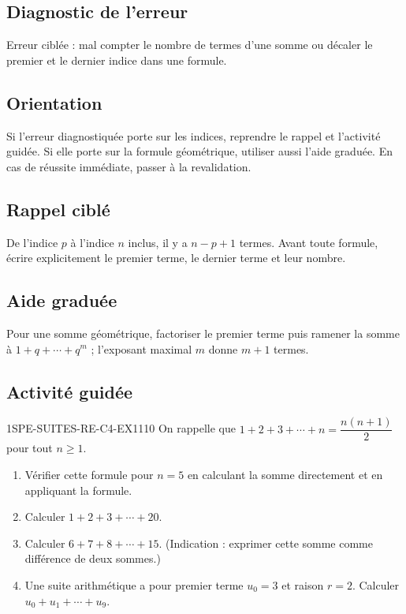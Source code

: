 

\subsection*{Diagnostic de l'erreur}
Erreur ciblée : mal compter le nombre de termes d'une somme ou décaler le
premier et le dernier indice dans une formule.

\subsection*{Orientation}
Si l'erreur diagnostiquée porte sur les indices, reprendre le rappel et
l'activité guidée. Si elle porte sur la formule géométrique, utiliser aussi
l'aide graduée. En cas de réussite immédiate, passer à la revalidation.

\subsection*{Rappel ciblé}
De l'indice $p$ à l'indice $n$ inclus, il y a $n-p+1$ termes. Avant toute
formule, écrire explicitement le premier terme, le dernier terme et leur
nombre.

\subsection*{Aide graduée}
Pour une somme géométrique, factoriser le premier terme puis ramener la somme
à $1+q+\cdots+q^m$ ; l'exposant maximal $m$ donne $m+1$ termes.

\subsection*{Activité guidée}


\begin{exercice}{1SPE-SUITES-RE-C4-EX1}{1}{10}
On rappelle que $1 + 2 + 3 + \cdots + n = \dfrac{n(n+1)}{2}$ pour tout $n \geq 1$.
\begin{enumerate}
  \item Vérifier cette formule pour $n = 5$ en calculant la somme directement et en appliquant la formule.
  \item Calculer $1 + 2 + 3 + \cdots + 20$.
  \item Calculer $6 + 7 + 8 + \cdots + 15$. (Indication : exprimer cette somme comme différence de deux sommes.)
  \item Une suite arithmétique a pour premier terme $u_0 = 3$ et raison $r = 2$. Calculer $u_0 + u_1 + \cdots + u_9$.
\end{enumerate}
\end{exercice}

